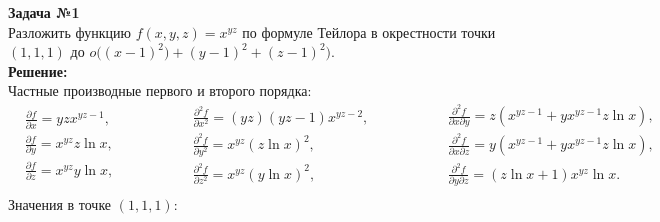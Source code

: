 \textbf{\large Задача №1}\\
\hspace*{0.5cm}Разложить функцию $f(x,y,z) = x^{yz}$ по формуле Тейлора в окрестности точки $(1,1,1)$ до $o\bigl((x-1)^2) + (y-1)^2 + (z-1)^2\bigr)$.\\[0.5cm]
\textbf{Решение:}\\
\hspace*{0.5cm} Частные производные первого и второго порядка:
\begin{equation*}
	\begin{aligned}
		&\frac{\partial f}{\partial x} = yzx^{yz-1},\\[5pt]
		&\frac{\partial f}{\partial y} = x^{yz}z\ln x,\\[5pt]
		&\frac{\partial f}{\partial z} = x^{yz}y\ln x,\\[5pt]
	\end{aligned} \qquad\qquad
	\begin{aligned}
		&\frac{\partial^2 f}{\partial x^2} = (yz)(yz-1)x^{yz-2},\\[5pt]
		&\frac{\partial^2 f}{\partial y^2} = x^{yz}(z\ln x)^2,\\[5pt]
		&\frac{\partial^2 f}{\partial z^2} = x^{yz}(y\ln x)^2,\\[5pt]
	\end{aligned} \qquad\qquad
	\begin{aligned}
		&\frac{\partial^2 f}{\partial x\partial y} = z(x^{yz-1} + yx^{yz-1}z\ln x),\\[5pt]
		&\frac{\partial^2 f}{\partial x \partial z} = y(x^{yz-1} + yx^{yz-1}z\ln x),\\[5pt]
		&\frac{\partial^2 f}{\partial y \partial z} =  (z \ln x + 1)x^{yz} \ln x.\\[5pt]
	\end{aligned}
\end{equation*}
Значения в точке $(1,1,1)$:
